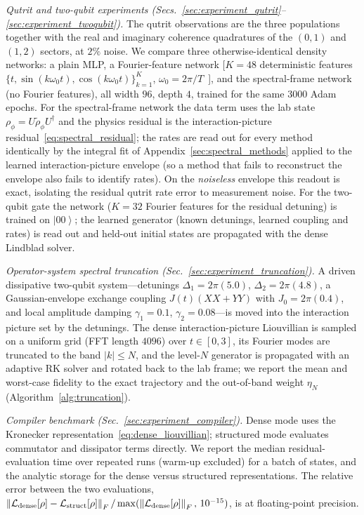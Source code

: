 \documentclass[twocolumn,aps,prxquantum,superscriptaddress,nofootinbib,floatfix,longbibliography]{revtex4-2}
\newcommand{\calL}{\mathcal{L}}
\newcommand{\norm}[1]{\left\lVert #1 \right\rVert}
\newcommand{\ket}[1]{\left\lvert #1 \right\rangle}
\newcommand{\rhophi}{\rho_{\phi}}
\begin{document}
\emph{Qutrit and two-qubit experiments (Secs.~\ref{sec:experiment_qutrit}--\ref{sec:experiment_twoqubit}).} The qutrit observations are the three populations together with the real and imaginary coherence quadratures of the $(0,1)$ and $(1,2)$ sectors, at $2\%$ noise. We compare three otherwise-identical density networks: a plain MLP, a Fourier-feature network [$K=48$ deterministic features $\{t,\sin(k\omega_0t),\cos(k\omega_0t)\}_{k=1}^{K}$, $\omega_0=2\pi/T$~\cite{tancik2020fourier}], and the spectral-frame network (no Fourier features), all width $96$, depth $4$, trained for the same $3000$ Adam epochs. For the spectral-frame network the data term uses the lab state $\rhophi=U\widetilde\rho_\phi U^\dagger$ and the physics residual is the interaction-picture residual~\eqref{eq:spectral_residual}; the rates are read out for every method identically by the integral fit of Appendix~\ref{sec:spectral_methods} applied to the learned interaction-picture envelope (so a method that fails to reconstruct the envelope also fails to identify rates). On the \emph{noiseless} envelope this readout is exact, isolating the residual qutrit rate error to measurement noise. For the two-qubit gate the network ($K=32$ Fourier features for the residual detuning) is trained on $\ket{00}$; the learned generator (known detunings, learned coupling and rates) is read out and held-out initial states are propagated with the dense Lindblad solver.

\emph{Operator-system spectral truncation (Sec.~\ref{sec:experiment_truncation}).} A driven dissipative two-qubit system---detunings $\Delta_1=2\pi(5.0)$, $\Delta_2=2\pi(4.8)$, a Gaussian-envelope exchange coupling $J(t)(XX{+}YY)$ with $J_0=2\pi(0.4)$, and local amplitude damping $\gamma_1=0.1$, $\gamma_2=0.08$---is moved into the interaction picture set by the detunings. The dense interaction-picture Liouvillian is sampled on a uniform grid (FFT length $4096$) over $t\in[0,3]$, its Fourier modes are truncated to the band $|k|\le N$, and the level-$N$ generator is propagated with an adaptive RK solver and rotated back to the lab frame; we report the mean and worst-case fidelity to the exact trajectory and the out-of-band weight $\eta_N$ (Algorithm~\ref{alg:truncation}).

\emph{Compiler benchmark (Sec.~\ref{sec:experiment_compiler}).} Dense mode uses the Kronecker representation~\eqref{eq:dense_liouvillian}; structured mode evaluates commutator and dissipator terms directly. We report the median residual-evaluation time over repeated runs (warm-up excluded) for a batch of states, and the analytic storage for the dense versus structured representations. The relative error between the two evaluations, $\norm{\calL_{\rm dense}[\rho]-\calL_{\rm struct}[\rho]}_F/\max(\norm{\calL_{\rm dense}[\rho]}_F,\,10^{-15})$, is at floating-point precision.
\end{document}
